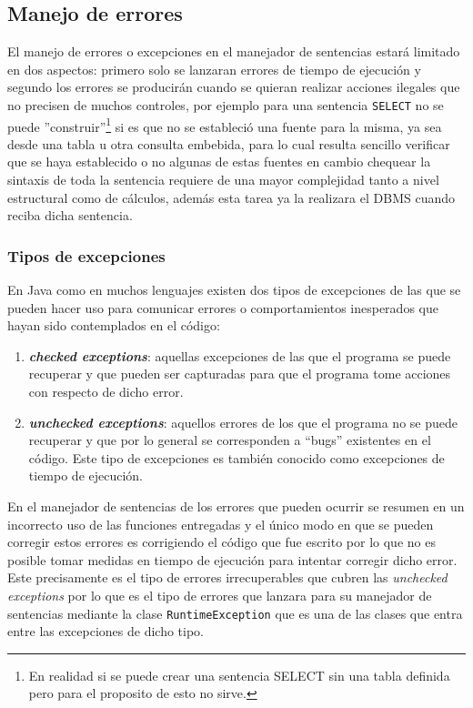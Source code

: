 \subsection{Manejo de errores}
El manejo de errores o excepciones en el manejador de sentencias estará limitado en dos aspectos: primero solo se lanzaran errores de tiempo de ejecución y segundo los errores se producirán cuando se quieran realizar acciones ilegales que no precisen de muchos controles, por ejemplo para una sentencia \verb=SELECT= no se puede ''construir''\footnote{En realidad si se puede crear una sentencia SELECT sin una tabla definida pero para el proposito de \jj esto no sirve.} si es que no se estableció una fuente para la misma, ya sea  desde una tabla u otra consulta embebida, para lo cual resulta sencillo verificar que se haya establecido o no algunas de estas fuentes en cambio chequear la sintaxis de toda la sentencia requiere de una mayor complejidad tanto a nivel estructural como de cálculos, además esta tarea ya la realizara el DBMS cuando reciba dicha sentencia.
%
\subsubsection{Tipos de excepciones}
En Java como en muchos lenguajes existen dos tipos de excepciones de las que se pueden hacer uso\citep{java:exeptions} para comunicar errores o comportamientos inesperados que hayan sido contemplados en el código:
\begin{enumerate}
\item \textbf{\textit{checked exceptions}}: aquellas excepciones de las que el programa se puede recuperar y que pueden ser capturadas para que el programa tome acciones con respecto de dicho error.
%
\item \textbf{\textit{unchecked exceptions}}: aquellos errores de los que el programa no se puede recuperar y que por lo general se corresponden a ``bugs'' existentes en el código. Este tipo de excepciones es también conocido como excepciones de tiempo de ejecución.
\end{enumerate}

En el manejador de sentencias de \jj los errores que pueden ocurrir se resumen en un incorrecto uso de las funciones entregadas y el único modo en que se pueden corregir estos errores es corrigiendo el código que fue escrito por lo que no es posible tomar medidas en tiempo de ejecución para intentar corregir dicho error. Este precisamente es el tipo de errores irrecuperables que cubren las \textit{unchecked exceptions} por lo que es el tipo de errores que lanzara \jj para su manejador de sentencias mediante la clase \verb=RuntimeException= que es una de las clases que entra entre las excepciones de dicho tipo.
%
